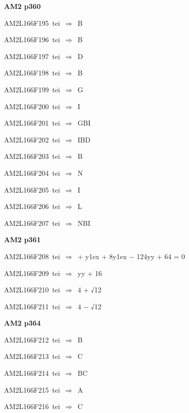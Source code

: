 \par\vfill\eject
{\bf\hfill AM2 p360\hfill\hbox{}}\par\bigskip
{\sixrm AM2L166F195\ {\sixit tei}\ }$\Rightarrow$\ B\par\smallskip
{\sixrm AM2L166F196\ {\sixit tei}\ }$\Rightarrow$\ B\par\smallskip
{\sixrm AM2L166F197\ {\sixit tei}\ }$\Rightarrow$\ D\par\smallskip
{\sixrm AM2L166F198\ {\sixit tei}\ }$\Rightarrow$\ B\par\smallskip
{\sixrm AM2L166F199\ {\sixit tei}\ }$\Rightarrow$\ G\par\smallskip
{\sixrm AM2L166F200\ {\sixit tei}\ }$\Rightarrow$\ I\par\smallskip
{\sixrm AM2L166F201\ {\sixit tei}\ }$\Rightarrow$\ GBI\par\smallskip
{\sixrm AM2L166F202\ {\sixit tei}\ }$\Rightarrow$\ IBD\par\smallskip
{\sixrm AM2L166F203\ {\sixit tei}\ }$\Rightarrow$\ B\par\smallskip
{\sixrm AM2L166F204\ {\sixit tei}\ }$\Rightarrow$\ N\par\smallskip
{\sixrm AM2L166F205\ {\sixit tei}\ }$\Rightarrow$\ I\par\smallskip
{\sixrm AM2L166F206\ {\sixit tei}\ }$\Rightarrow$\ L\par\smallskip
{\sixrm AM2L166F207\ {\sixit tei}\ }$\Rightarrow$\ NBI\par\smallskip

\par\vfill\eject
{\bf\hfill AM2 p361\hfill\hbox{}}\par\bigskip
{\sixrm AM2L166F208\ {\sixit tei}\ }$\Rightarrow$\ + {\tenit y}\raise1ex\hbox{} + 8{\tenit y}\raise1ex\hbox{} − 124{\tenit yy} + 64 = 0\par\smallskip
{\sixrm AM2L166F209\ {\sixit tei}\ }$\Rightarrow$\ {\tenit yy} + 16\par\smallskip
{\sixrm AM2L166F210\ {\sixit tei}\ }$\Rightarrow$\ 4 + √12\par\smallskip
{\sixrm AM2L166F211\ {\sixit tei}\ }$\Rightarrow$\ 4 − √12\par\smallskip

\par\vfill\eject
{\bf\hfill AM2 p364\hfill\hbox{}}\par\bigskip
{\sixrm AM2L166F212\ {\sixit tei}\ }$\Rightarrow$\ B\par\smallskip
{\sixrm AM2L166F213\ {\sixit tei}\ }$\Rightarrow$\ C\par\smallskip
{\sixrm AM2L166F214\ {\sixit tei}\ }$\Rightarrow$\ BC\par\smallskip
{\sixrm AM2L166F215\ {\sixit tei}\ }$\Rightarrow$\ A\par\smallskip
{\sixrm AM2L166F216\ {\sixit tei}\ }$\Rightarrow$\ C\par\smallskip

